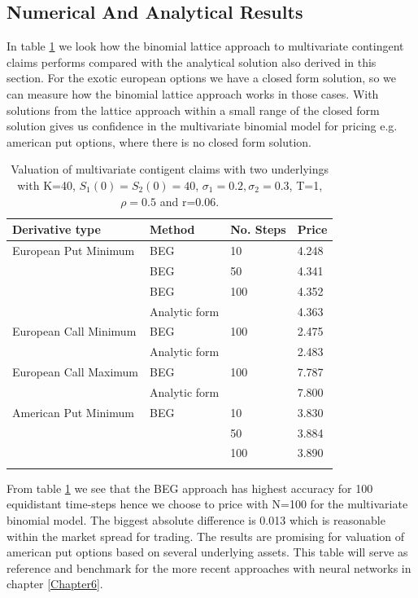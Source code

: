 \subsection{Numerical And Analytical Results}
In table \ref{tab:multidimTree} we look how the binomial lattice approach to multivariate contingent claims performs compared with the analytical solution also derived in this section. For the exotic european options we have a closed form solution, so we can measure how the binomial lattice approach works in those cases. With solutions from the lattice approach within a small range of the closed form solution gives us confidence in the multivariate binomial model for pricing e.g. american put options, where there is no closed form solution.
\begin{table}[H]
\caption{Valuation of multivariate contigent claims with two underlyings with K=40, $S_1(0)=S_2(0)=40$, $\sigma_1=0.2, \sigma_2=0.3$, T=1, $\rho=0.5$  and r=0.06.}
\label{tab:multidimTree}
\centering
\begin{tabular}{l l l l}
\toprule
\textbf{Derivative type} & \textbf{Method} & \textbf{No. Steps} & \textbf{Price} \\
\midrule
European Put Minimum & BEG & 10 & 4.248 \\
 & BEG & 50 & 4.341 \\
 & BEG & 100 & 4.352 \\
& Analytic form & & 4.363\\
European Call Minimum & BEG & 100 & 2.475\\
& Analytic form & & 2.483\\
European Call Maximum & BEG & 100 & 7.787\\
& Analytic form & & 7.800\\
American Put Minimum & BEG & 10 & 3.830\\
 &  & 50 & 3.884\\
 &  & 100 & 3.890\\
\bottomrule\\
\end{tabular}
\end{table}
From table \ref{tab:multidimTree} we see that the BEG approach has highest accuracy for 100 equidistant time-steps hence we choose to price with N=100 for the multivariate binomial model. The biggest absolute difference is 0.013 which is reasonable within the market spread for trading. The results are promising for valuation of american put options based on several underlying assets. This table will serve as reference and benchmark for the more recent approaches with neural networks in chapter \ref{Chapter6}.
